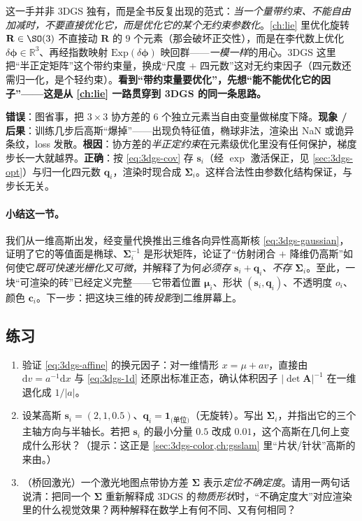 \begin{insight}
这一手并非 3DGS 独有，而是全书反复出现的范式：\emph{当一个量带约束、不能自由加减时，不要直接优化它，而是优化它的某个无约束参数化}。\cref{ch:lie} 里优化旋转 $\mathbf R\in\SO(3)$ 不直接动 $\mathbf R$ 的 $9$ 个元素（那会破坏正交性），而是在李代数上优化 $\delta\boldsymbol\phi\in\mathbb R^3$、再经指数映射 $\mathrm{Exp}(\delta\boldsymbol\phi)$ 映回群——\emph{一模一样}的用心。3DGS 这里把“半正定矩阵”这个带约束量，换成“尺度 $+$ 四元数”这对无约束因子（四元数还需归一化，是个轻约束）。\textbf{看到“带约束量要优化”，先想“能不能优化它的因子”——这是从 \cref{ch:lie} 一路贯穿到 3DGS 的同一条思路。}
\end{insight}

\begin{pitfall}
\textbf{错误}：图省事，把 $3\times3$ 协方差的 $6$ 个独立元素当自由变量做梯度下降。\textbf{现象 / 后果}：训练几步后高斯“爆掉”——出现负特征值，椭球非法，渲染出 NaN 或诡异条纹，loss 发散。\textbf{根因}：协方差的\emph{半正定约束}在元素级优化里没有任何保护，梯度步长一大就越界。\textbf{正确}：按 \cref{eq:3dgs-cov} 存 $\mathbf s_i$（经 $\exp$ 激活保正，见 \cref{sec:3dgs-opt}）与归一化四元数 $\mathbf q_i$，渲染时现合成 $\boldsymbol\Sigma_i$。这样合法性由参数化结构保证，与步长无关。
\end{pitfall}

\paragraph{小结这一节。}
我们从一维高斯出发，经变量代换推出三维各向异性高斯核 \cref{eq:3dgs-gaussian}，证明了它的等值面是椭球、$\boldsymbol\Sigma_i^{-1}$ 是形状矩阵，论证了“仿射闭合 $+$ 降维仍高斯”如何使它\emph{既可快速光栅化又可微}，并解释了为何\emph{必须存 $\mathbf s_i+\mathbf q_i$、不存 $\boldsymbol\Sigma_i$}。至此，一块“可渲染的砖”已经定义完整——它带着位置 $\boldsymbol\mu_i$、形状 $(\mathbf s_i,\mathbf q_i)$、不透明度 $o_i$、颜色 $\mathbf c_i$。下一步：把这块三维的砖\emph{投影}到二维屏幕上。

\subsection*{练习}
\begin{enumerate}
  \item 验证 \cref{eq:3dgs-affine} 的换元因子：对一维情形 $x=\mu+av$，直接由 $\mathrm dv=a^{-1}\mathrm dx$ 与 \cref{eq:3dgs-1d} 还原出标准正态，确认体积因子 $|\det\mathbf A|^{-1}$ 在一维退化成 $1/|a|$。
  \item 设某高斯 $\mathbf s_i=(2,1,0.5)$、$\mathbf q_i=\mathbf 1_{\text{(单位)}}$（无旋转）。写出 $\boldsymbol\Sigma_i$，并指出它的三个主轴方向与半轴长。若把 $\mathbf s_i$ 的最小分量 $0.5$ 改成 $0.01$，这个高斯在几何上变成什么形状？（提示：这正是 \cref{sec:3dgs-color,ch:gsslam} 里“片状/针状”高斯的来由。）
  \item （桥回激光）一个激光地图点带协方差 $\boldsymbol\Sigma$ 表示\emph{定位不确定度}。请用一两句话说清：把同一个 $\boldsymbol\Sigma$ 重新解释成 3DGS 的\emph{物质形状}时，“不确定度大”对应渲染里的什么视觉效果？两种解释在数学上有何不同、又有何相同？
\end{enumerate}

